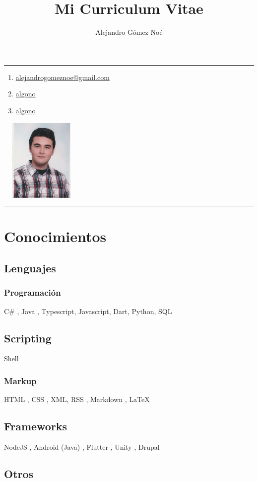 \documentclass[letterpaper, 12pt]{article}
\makeatletter
\newcommand{\name}{
    {\huge\bfseries\MakeUppercase{\theauthor}}

    \rule{.65\textwidth}{.4pt}
}
\renewcommand{\maketitle}{
    \begin{center}

        \name

    \end{center}
}
\newcommand{\emailnoref}{alejandrogomeznoe@gmail.com}
\newcommand{\email}{\href{mailto:\emailnoref}{\emailnoref}}
\newcommand{\githubpage}{\href{https://github.com/algono}{algono}}
\newcommand{\gitlabpage}{\href{https://gitlab.com/algono}{algono}}
\newcommand{\iconoEmail}{\faEnvelope}
\newcommand{\iconoGitHub}{\faGithub}
\newcommand{\iconoGitLab}{\faGitlab}
\newcommand{\contactinfo}{
    \begin{minipage}[c]{.7\textwidth}
        \begin{large}
            \begin{enumerate}[labelsep=.5em,itemsep=12pt]
                \item [\iconoEmail] \email
                \item [\iconoGitHub] \githubpage
                \item [\iconoGitLab] \gitlabpage
            \end{enumerate}
        \end{large}
    \end{minipage}
    \begin{minipage}[r]{.2\textwidth}
        \includegraphics[width=4cm,height=4cm,keepaspectratio]{mi-foto.jpg}
    \end{minipage}
}
\makeatother
\begin{document}
    
    \title{Mi Curriculum Vitae}
    \author{Alejandro Gómez Noé}
    
    \maketitle

    \vspace{12pt}

    \contactinfo

    \vspace{8pt}

    \rule{.9\textwidth}{.4pt}

    \section{Conocimientos}

    \subsection{Lenguajes}

    \subsubsection{Programación}

    C\# \faWindows, Java \faCoffee, Typescript, Javascript, Dart, Python, SQL \faDatabase

    \subsection{Scripting}

    Shell \faLinux

    \subsubsection{Markup}

    HTML , CSS , XML, RSS \faRss, Markdown \faEdit, \LaTeX

    \subsection{Frameworks}

    NodeJS \faServer, Android (Java) \faAndroid, Flutter \faMobile, Unity \faGamepad, Drupal \faDrupal

    \subsection{Otros}
\end{document}
